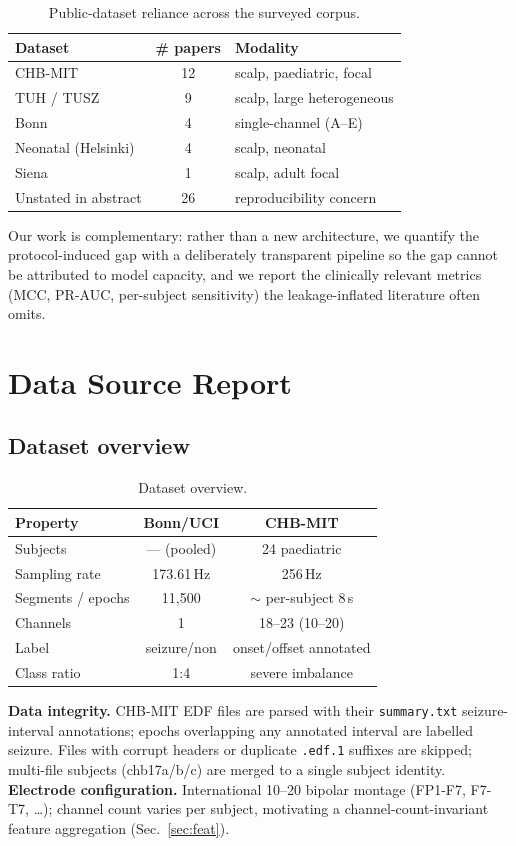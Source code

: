 \documentclass[10pt,journal,twocolumn]{IEEEtran}
\begin{document}
\begin{table}[h]\centering\caption{Public-dataset reliance across the surveyed corpus.}\label{tab:dsuse}
\begin{tabular}{lcl}\toprule
Dataset & \# papers & Modality\\\midrule
CHB-MIT & 12 & scalp, paediatric, focal\\
TUH / TUSZ & 9 & scalp, large heterogeneous\\
Bonn & 4 & single-channel (A--E)\\
Neonatal (Helsinki) & 4 & scalp, neonatal\\
Siena & 1 & scalp, adult focal\\
Unstated in abstract & 26 & reproducibility concern\\\bottomrule
\end{tabular}\end{table}

Our work is complementary: rather than a new architecture, we quantify the protocol-induced gap with a deliberately transparent pipeline so the gap cannot be attributed to model capacity, and we report the clinically relevant metrics (MCC, PR-AUC, per-subject sensitivity) the leakage-inflated literature often omits.

\section{Data Source Report}
\subsection{Dataset overview}
\begin{table}[h]\centering\caption{Dataset overview.}\label{tab:dsov}
\begin{tabular}{lcc}\toprule
Property & Bonn/UCI & CHB-MIT\\\midrule
Subjects & --- (pooled) & 24 paediatric\\
Sampling rate & 173.61\,Hz & 256\,Hz\\
Segments / epochs & 11{,}500 & $\sim$ per-subject 8\,s\\
Channels & 1 & 18--23 (10--20)\\
Label & seizure/non & onset/offset annotated\\
Class ratio & 1:4 & severe imbalance\\\bottomrule
\end{tabular}\end{table}
\textbf{Data integrity.} CHB-MIT EDF files are parsed with their \texttt{summary.txt} seizure-interval annotations; epochs overlapping any annotated interval are labelled seizure. Files with corrupt headers or duplicate \texttt{.edf.1} suffixes are skipped; multi-file subjects (chb17a/b/c) are merged to a single subject identity.
\textbf{Electrode configuration.} International 10--20 bipolar montage (FP1-F7, F7-T7, \ldots); channel count varies per subject, motivating a channel-count-invariant feature aggregation (Sec.~\ref{sec:feat}).
\end{document}
